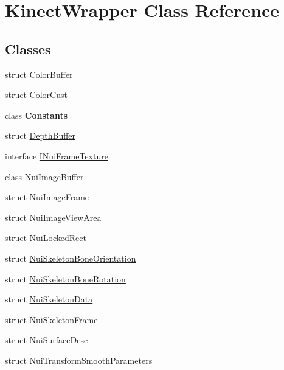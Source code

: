 \hypertarget{class_kinect_wrapper}{}\section{Kinect\+Wrapper Class Reference}
\label{class_kinect_wrapper}
\subsection*{Classes}
\begin{DoxyCompactItemize}
\item 
struct \mbox{\hyperlink{struct_kinect_wrapper_1_1_color_buffer}{Color\+Buffer}}
\item 
struct \mbox{\hyperlink{struct_kinect_wrapper_1_1_color_cust}{Color\+Cust}}
\item 
class {\bfseries Constants}
\item 
struct \mbox{\hyperlink{struct_kinect_wrapper_1_1_depth_buffer}{Depth\+Buffer}}
\item 
interface \mbox{\hyperlink{interface_kinect_wrapper_1_1_i_nui_frame_texture}{I\+Nui\+Frame\+Texture}}
\item 
class \mbox{\hyperlink{class_kinect_wrapper_1_1_nui_image_buffer}{Nui\+Image\+Buffer}}
\item 
struct \mbox{\hyperlink{struct_kinect_wrapper_1_1_nui_image_frame}{Nui\+Image\+Frame}}
\item 
struct \mbox{\hyperlink{struct_kinect_wrapper_1_1_nui_image_view_area}{Nui\+Image\+View\+Area}}
\item 
struct \mbox{\hyperlink{struct_kinect_wrapper_1_1_nui_locked_rect}{Nui\+Locked\+Rect}}
\item 
struct \mbox{\hyperlink{struct_kinect_wrapper_1_1_nui_skeleton_bone_orientation}{Nui\+Skeleton\+Bone\+Orientation}}
\item 
struct \mbox{\hyperlink{struct_kinect_wrapper_1_1_nui_skeleton_bone_rotation}{Nui\+Skeleton\+Bone\+Rotation}}
\item 
struct \mbox{\hyperlink{struct_kinect_wrapper_1_1_nui_skeleton_data}{Nui\+Skeleton\+Data}}
\item 
struct \mbox{\hyperlink{struct_kinect_wrapper_1_1_nui_skeleton_frame}{Nui\+Skeleton\+Frame}}
\item 
struct \mbox{\hyperlink{struct_kinect_wrapper_1_1_nui_surface_desc}{Nui\+Surface\+Desc}}
\item 
struct \mbox{\hyperlink{struct_kinect_wrapper_1_1_nui_transform_smooth_parameters}{Nui\+Transform\+Smooth\+Parameters}}
\end{DoxyCompactItemize}
